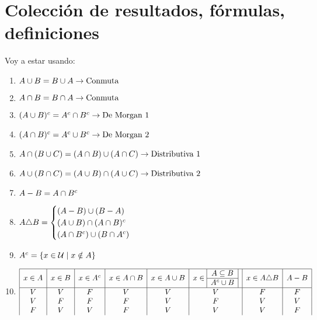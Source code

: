 \section*{Colección de resultados, fórmulas, definiciones}
Voy a estar usando:
\begin{enumerate}[label=(\alph*)]
	\item $A \cup B = B \cup A \to \text{Conmuta}$
	\item $A \cap B = B \cap A \to \text{Conmuta}$
	\item $(A \cup B)^c = A^c \cap B^c \to \text{De Morgan 1}$
	\item $(A \cap B)^c = A^c \cup B^c \to \text{De Morgan 2}$
	\item $A \cap(B \cup C) = (A \cap B) \cup (A \cap C) \to \text{Distributiva 1}$
	\item $A \cup(B \cap C) = (A \cup B) \cap (A \cup C) \to \text{Distributiva 2}$
	\item $A - B = A \cap B^c$
	\item $A \triangle B =
		      \begin{cases}
			      (A - B) \cup (B - A)             \\
			      (A \cup B) \cap (A \cap B)^c \\
			      (A \cap B^c) \cup (B \cap A^c)
		      \end{cases}
	      $
	\item $A^c = \left\{ x \in \mathcal U \;|\; x \notin A \right\}$
	\item
	      \def\subconjuntoYequivalente{
		      \begin{array}{|c|}
			      A \subseteq B \\
			      \hline
			      A^c \union B
		      \end{array}
	      }
	      \[
		      \begin{array}{|c|c|c|c|c|c|c|c|}
			      \hline
			      x \en A & x \en B & x \en A^c & x \en A \inter B & x \en A \union B & x \en \subconjuntoYequivalente & x \en A \triangle B & A - B \\
			      \hline
			      V       & V       & F         & V                & V                & V                              & F                   & F     \\
			      V       & F       & F         & F                & V                & F                              & V                   & V     \\
			      F       & V       & V         & F                & V                & V                              & V                   & F     \\

\end{array}\]
\end{enumerate}
